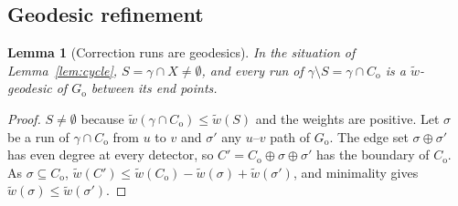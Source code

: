 \documentclass[11pt]{article}
\theoremstyle{plain}
\newtheorem{lemma}{Lemma}
\theoremstyle{definition}
\theoremstyle{remark}
\newcommand{\Go}{G_{\mathrm{o}}}
\newcommand{\Co}{C_{\mathrm{o}}}
\newcommand{\tw}{\tilde w}
\renewcommand{\_}{\oldunderscore\allowbreak}
\begin{document}
\subsection{Geodesic refinement}

\begin{lemma}[Correction runs are geodesics]\label{lem:geodesic}
In the situation of Lemma~\ref{lem:cycle}, $S=\gamma\cap X\ne\emptyset$, and every run of $\gamma\setminus S=\gamma\cap\Co$ is a $\tw$-geodesic of $\Go$ between its end points.
\end{lemma}
\begin{proof}
$S\ne\emptyset$ because $\tw(\gamma\cap\Co)\le\tw(S)$ and the weights are positive. Let $\sigma$ be a run of $\gamma\cap\Co$ from $u$ to $v$ and $\sigma'$ any $u$--$v$ path of $\Go$. The edge set $\sigma\oplus\sigma'$ has even degree at every detector, so $C'=\Co\oplus\sigma\oplus\sigma'$ has the boundary of $\Co$. As $\sigma\subseteq\Co$, $\tw(C')\le\tw(\Co)-\tw(\sigma)+\tw(\sigma')$, and minimality gives $\tw(\sigma)\le\tw(\sigma')$.
\end{proof}
\end{document}
